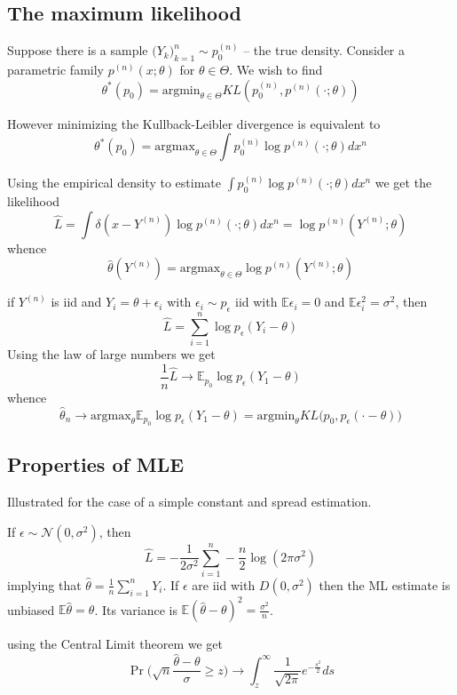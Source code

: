 \documentclass[a4paper]{article}
\newcommand{\Ncal}{\mathcal{N}}
\newcommand{\Ex}{\mathbb{E}}
\begin{document}

\subsection{The maximum likelihood} %
\label{sub:the_maximum_likelihood}

Suppose there is a sample $\big(Y_k\big)_{k=1}^n\sim p^{(n)}_0$ -- the true density. Consider a parametric family $p^{(n)}(x;\theta)$ for $\theta\in \Theta$.
We wish to find 
\[\theta^*(p_0)=\text{argmin}_{\theta\in \Theta} KL(p^{(n)}_0, p^{(n)}(\cdot;\theta))\]

However minimizing the Kullback-Leibler divergence is equivalent to 
\[\theta^*(p_0)=\text{argmax}_{\theta\in \Theta} \int p^{(n)}_0 \log p^{(n)}(\cdot;\theta) dx^n\]

Using the empirical density to estimate $\int p^{(n)}_0 \log p^{(n)}(\cdot;\theta) dx^n$ we get the likelihood
\[\hat{L} = \int \delta(x-Y^{(n)}) \log p^{(n)}(\cdot;\theta) dx^n = \log p^{(n)}(Y^{(n)};\theta)\]
whence 
\[\hat{\theta}(Y^{(n)}) = \text{argmax}_{\theta\in \Theta} \log p^{(n)}(Y^{(n)};\theta)\]

if $Y^{(n)}$ is iid and $Y_i = \theta + \epsilon_i$ with $\epsilon_i\sim p_\epsilon$ iid with $\Ex \epsilon_i = 0$ and $\Ex \epsilon_i^2 = \sigma^2$, then
\[\hat{L} = \sum_{i=1}^n\log p_\epsilon(Y_i-\theta)\]
Using the law of large numbers we get
\[\frac{1}{n}\hat{L} \to \Ex_{p_0}\log p_\epsilon(Y_1-\theta)\]
whence
\[\hat{\theta}_n \to \text{argmax}_{\theta}\Ex_{p_0}\log p_\epsilon(Y_1-\theta) = \text{argmin}_{\theta} KL\Big(p_0,p_\epsilon(\cdot - \theta)\Big)\]


\subsection{Properties of MLE} %
\label{sub:properties_of_mle}
Illustrated for the case of a simple constant and spread estimation.

If $\epsilon\sim \Ncal(0,\sigma^2)$, then 
\[\hat{L} = -\frac{1}{2\sigma^2}\sum_{i=1}^n - \frac{n}{2}\log(2\pi \sigma^2)\]
implying that $\hat{\theta} = \frac{1}{n}\sum_{i=1}^n Y_i$.
If $\epsilon$ are iid with $D(0,\sigma^2)$ then the ML estimate is unbiased $\Ex \hat{\theta} = \theta$.
Its variance is $\Ex (\hat{\theta}-\theta)^2 = \frac{\sigma^2}{n}$.

using the Central Limit theorem we get
\[\Pr\big(\sqrt{n} \frac{\hat{\theta}-\theta}{\sigma} \geq z\big)\to \int_z^\infty \frac{1}{\sqrt{2\pi}} e^{-\frac{s^2}{2}}ds \]
\end{document}
